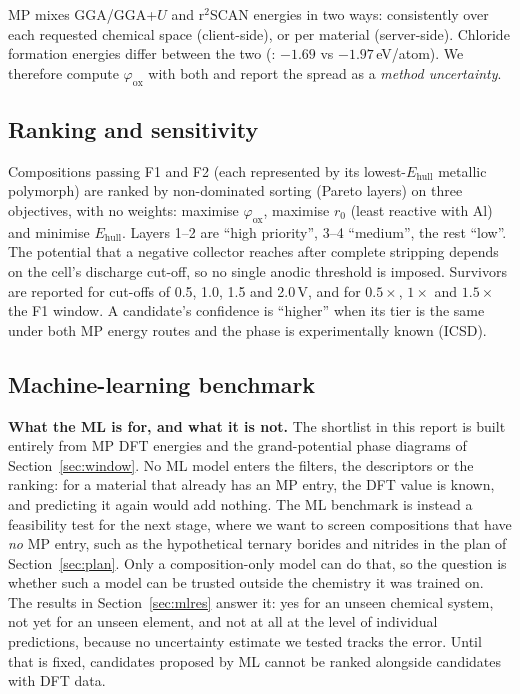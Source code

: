 \documentclass{report}
\newcommand{\phiox}{\varphi_{\mathrm{ox}}}
\newcommand{\Ehull}{E_{\mathrm{hull}}}
\begin{document}
MP mixes GGA/GGA+$U$ and r$^2$SCAN energies in two ways: consistently over each requested chemical space (client-side), or per material (server-side). Chloride formation energies differ between the two (: $-1.69$ vs $-1.97$\,eV/atom). We therefore compute $\phiox$ with both and report the spread as a \emph{method uncertainty}.

\subsection{Ranking and sensitivity}
Compositions passing F1 and F2 (each represented by its lowest-$\Ehull$ metallic polymorph) are ranked by non-dominated sorting (Pareto layers) on three objectives, with no weights: maximise $\phiox$, maximise $r_0$ (least reactive with Al) and minimise $\Ehull$. Layers 1--2 are ``high priority'', 3--4 ``medium'', the rest ``low''. The potential that a negative collector reaches after complete stripping depends on the cell's discharge cut-off, so no single anodic threshold is imposed. Survivors are reported for cut-offs of 0.5, 1.0, 1.5 and 2.0\,V, and for $0.5\times$, $1\times$ and $1.5\times$ the F1 window. A candidate's confidence is ``higher'' when its tier is the same under both MP energy routes and the phase is experimentally known (ICSD).

\subsection{Machine-learning benchmark}
\label{sec:ml}

\textbf{What the ML is for, and what it is not.} The shortlist in this report is built entirely from MP DFT energies and the grand-potential phase diagrams of Section~\ref{sec:window}. No ML model enters the filters, the descriptors or the ranking: for a material that already has an MP entry, the DFT value is known, and predicting it again would add nothing. The ML benchmark is instead a feasibility test for the next stage, where we want to screen compositions that have \emph{no} MP entry, such as the hypothetical ternary borides and nitrides in the plan of Section~\ref{sec:plan}. Only a composition-only model can do that, so the question is whether such a model can be trusted outside the chemistry it was trained on. The results in Section~\ref{sec:mlres} answer it: yes for an unseen chemical system, not yet for an unseen element, and not at all at the level of individual predictions, because no uncertainty estimate we tested tracks the error. Until that is fixed, candidates proposed by ML cannot be ranked alongside candidates with DFT data.
\end{document}
